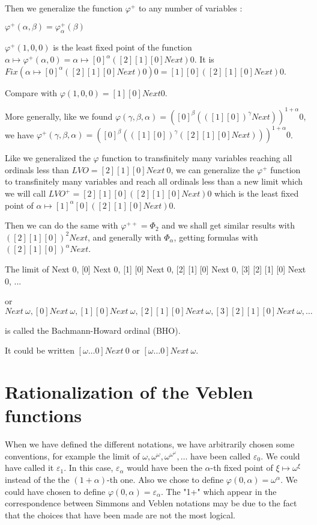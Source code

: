 \documentclass[10pt]{article}
\begin{document}
Then we generalize the function \( \varphi^+ \) to any number of variables : 

\( \varphi^+(\alpha,\beta) = \varphi^+_\alpha(\beta) \)

\( \varphi^+(1,0,0) \) is the least fixed point of the function \( \alpha \mapsto \varphi^+(\alpha,0) = \alpha \mapsto [0]^\alpha ([2] [1] [0] Next) 0 \). It is \( Fix (\alpha \mapsto [0]^\alpha ([2] [1] [0] Next) 0) 0 = [1] [0] ([2] [1] [0] Next) 0 \).

Compare with \( \varphi(1,0,0) = [1] [0] Next 0 \).

More generally, like we found \( \varphi(\gamma,\beta,\alpha) = ([0]^\beta (([1] [0])^\gamma Next))^{1+\alpha} 0 \), we have \( \varphi^+(\gamma,\beta,\alpha) = ([0]^\beta (([1] [0])^\gamma ([2] [1] [0] Next)))^{1+\alpha} 0 \).

Like we generalized the \( \varphi \) function to transfinitely many variables reaching all ordinals less than \( LVO = [2] [1] [0] Next\ 0 \), we can generalize the \( \varphi^+ \) function to transfinitely many variables and reach all ordinals less than a new limit which we will call \( LVO^+ = [2] [1] [0] ([2] [1] [0] Next) 0 \) which is the least fixed point of \( \alpha \mapsto [1]^\alpha [0] ([2] [1] [0] Next) 0 \).

Then we can do the same with \( \varphi^{++} = \Phi_2 \) and we shall get similar results with \( ([2] [1] [0])^2 Next \), and generally with \( \Phi_\alpha \), getting formulas with \( ([2] [1] [0])^\alpha Next \).


\bigskip



The limit of Next 0, [0] Next 0, [1] [0] Next 0, [2] [1] [0] Next 0, [3] [2] [1] [0] Next 0, ... 

or \( Next\ \omega, [0] Next\ \omega, [1] [0] Next\ \omega, [2] [1] [0] Next\ \omega, [3] [2] [1] [0] Next\ \omega, \ldots \) 

is called the Bachmann-Howard ordinal (BHO). 

It could be written \( [\omega \ldots 0] Next\ 0 \) or \( [\omega \ldots 0] Next\ \omega \).


\section{Rationalization of the Veblen functions}

When we have defined the different notations, we have arbitrarily chosen some conventions, for example the limit of \( \omega, \omega^\omega, \omega^{\omega^\omega}, \ldots \) have been called  \( \varepsilon_0 \). We could have called it \( \varepsilon_1 \). In this case, \( \varepsilon_\alpha \) would have been the \( \alpha \)-th fixed point of \( \xi \mapsto \omega^\xi \) instead of the the \( (1+\alpha) \)-th one. Also we chose to define \( \varphi(0,\alpha) = \omega^\alpha \). We could have chosen to define \( \varphi(0,\alpha) = \varepsilon_\alpha \). The "1+" which appear in the correspondence between Simmons and Veblen notations may be due to the fact that the choices that have been made are not the most logical. 
\end{document}
